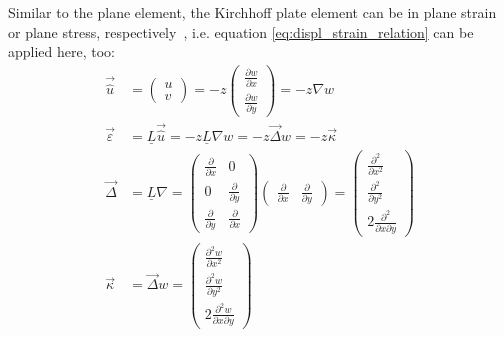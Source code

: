   Similar to the plane element, the Kirchhoff plate element can be in plane strain or plane stress, respectively~\cite{steinke2005finite}, i.e. equation \eqref{eq:displ_strain_relation} can be applied here, too:
  \begin{align}
  \vec{\hat{u}} &= \begin{pmatrix}
  u\\v
  \end{pmatrix} = -z \begin{pmatrix}
  \frac{\partial w}{\partial x}\\ \frac{\partial w}{\partial y}
  \end{pmatrix} = -z \nabla w \nonumber\\
  \vec{\varepsilon} &= \underline{L} \vec{\hat{u}} = -z \underline{L} \nabla w = -z \vec{\Delta} w = -z \vec{\kappa} \label{eq:eps=-z*kappa}\\
  \vec{\Delta} &= \underline{L} \nabla = \begin{pmatrix}
  \frac{\partial}{\partial x} & 0\\
  0 & \frac{\partial}{\partial y}\\
  \frac{\partial}{\partial y} & \frac{\partial}{\partial x}
  \end{pmatrix} \begin{pmatrix}
  \frac{\partial}{\partial x} & \frac{\partial}{\partial y}
  \end{pmatrix} = \begin{pmatrix}
  \frac{\partial^2}{\partial x^2}\\
  \frac{\partial^2}{\partial y^2}\\
  2\frac{\partial^2}{\partial x\partial y}
  \end{pmatrix} \nonumber\\
  \vec{\kappa} &= \vec{\Delta}w = \begin{pmatrix}
  \frac{\partial^2w}{\partial x^2}\\
  \frac{\partial^2w}{\partial y^2}\\
  2\frac{\partial^2w}{\partial x\partial y}
  \end{pmatrix} \label{eq:kappa=Delta*w}
  \end{align}
  
